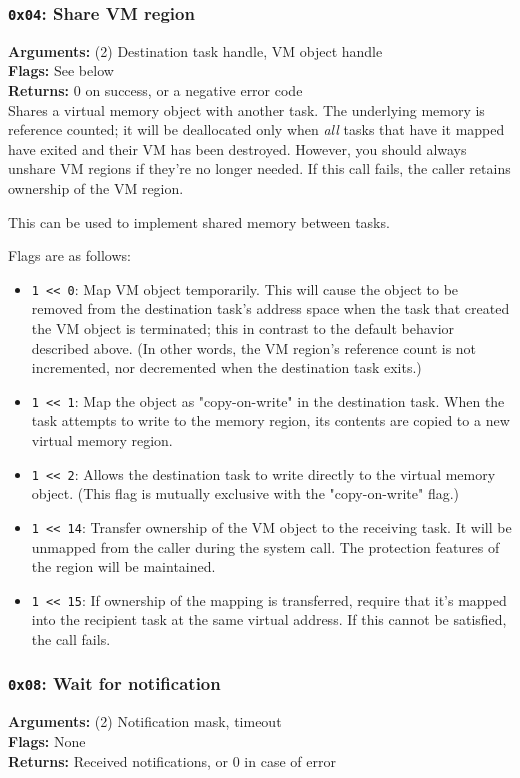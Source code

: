 \documentclass[11pt]{article}
\begin{document}
\subsubsection{{\tt 0x04}: Share VM region}
\textbf{Arguments:} (2) Destination task handle, VM object handle \\
\textbf{Flags:} See below \\
\textbf{Returns:} 0 on success, or a negative error code \\

Shares a virtual memory object with another task. The underlying memory is reference counted; it will be deallocated only when \textit{all} tasks that have it mapped have exited and their VM has been destroyed. However, you should always unshare VM regions if they're no longer needed. If this call fails, the caller retains ownership of the VM region.

This can be used to implement shared memory between tasks.

Flags are as follows:

\begin{itemize}
\item \texttt{1 << 0}: Map VM object temporarily. This will cause the object to be removed from the destination task's address space when the task that created the VM object is terminated; this in contrast to the default behavior described above. (In other words, the VM region's reference count is not incremented, nor decremented when the destination task exits.)
\item \texttt{1 << 1}: Map the object as "copy-on-write" in the destination task. When the task attempts to write to the memory region, its contents are copied to a new virtual memory region.
\item \texttt{1 << 2}: Allows the destination task to write directly to the virtual memory object. (This flag is mutually exclusive with the "copy-on-write" flag.)
\item \texttt{1 << 14}: Transfer ownership of the VM object to the receiving task. It will be unmapped from the caller during the system call. The protection features of the region will be maintained.
\item \texttt{1 << 15}: If ownership of the mapping is transferred, require that it's mapped into the recipient task at the same virtual address. If this cannot be satisfied, the call fails.
\end{itemize}

\subsubsection{{\tt 0x08}: Wait for notification}
\textbf{Arguments:} (2) Notification mask, timeout \\
\textbf{Flags:} None \\
\textbf{Returns:} Received notifications, or 0 in case of error \\
\end{document}
